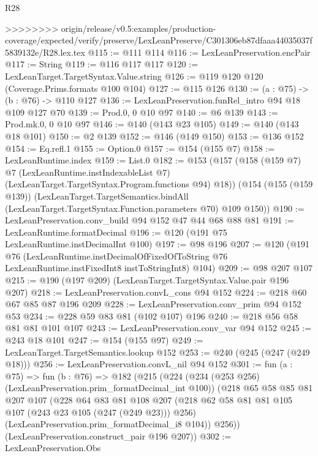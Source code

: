 \begin{lexlean}{R28}
\begin{coremodule}
{{{{{>>>>>>>> origin/release/v0.5:examples/production-coverage/expected/verify/preserve/LexLeanPreserve/C301306eb87dfaaa44035037f5839132e/R28.lex.tex
@115 := @111 @114
@116 := LexLeanPreservation.encPair
@117 := String
@119 := @116 @117 @117
@120 := LexLeanTarget.TargetSyntax.Value.string
@126 := @119 @120 @120 (Coverage.Prims.formats @100 @104)
@127 := @115 @126
@130 := (a : @75) -> (b : @76) -> @110 @127
@136 := LexLeanPreservation.funRel_intro @94 @18 @109 @127 @70
@139 := Prod.{0, 0} @10 @97
@140 := @6 @139
@143 := Prod.mk.{0, 0} @10 @97
@146 := @140 (@143 @23 @105)
@149 := @140 (@143 @18 @101)
@150 := @2 @139
@152 := @146 (@149 @150)
@153 := @136 @152
@154 := Eq.refl.{1}
@155 := Option.{0}
@157 := @154 (@155 @7)
@158 := LexLeanRuntime.index
@159 := List.{0}
@182 := @153
    (@157
      (@158
        (@159 @7)
        @7
        (LexLeanRuntime.instIndexableList @7)
        (LexLeanTarget.TargetSyntax.Program.functions @94)
        @18))
    (@154
      (@155 (@159 @139))
      (LexLeanTarget.TargetSemantics.bindAll
        (LexLeanTarget.TargetSyntax.Function.parameters @70)
        @109
        @150))
@190 := LexLeanPreservation.conv_build @94 @152 @47 @44 @68 @88 @81
@191 := LexLeanRuntime.formatDecimal
@196 := @120 (@191 @75 LexLeanRuntime.instDecimalInt @100)
@197 := @98 @196
@207 := @120
    (@191
      @76
      (LexLeanRuntime.instDecimalOfFixedOfToString
        @76
        LexLeanRuntime.instFixedInt8
        instToStringInt8)
      @104)
@209 := @98 @207 @107
@215 := @190 (@197 @209) (LexLeanTarget.TargetSyntax.Value.pair @196 @207)
@218 := LexLeanPreservation.convL_cons @94 @152
@224 := @218 @60 @67 @85 @87 @196 @209
@228 := LexLeanPreservation.conv_prim @94 @152 @53
@234 := @228 @59 @83 @81 (@102 @107) @196
@240 := @218 @56 @58 @81 @81 @101 @107
@243 := LexLeanPreservation.conv_var @94 @152
@245 := @243 @18 @101
@247 := @154 (@155 @97)
@249 := LexLeanTarget.TargetSemantics.lookup @152
@253 := @240 (@245 (@247 (@249 @18)))
@256 := LexLeanPreservation.convL_nil @94 @152
@301 := fun (a : @75) =>
  fun (b : @76) =>
  @182
    (@215
      (@224
        (@234 (@253 @256) (LexLeanPreservation.prim_formatDecimal_int @100))
        (@218
          @65
          @58
          @85
          @81
          @207
          @107
          (@228
            @64
            @83
            @81
            @108
            @207
            (@218 @62 @58 @81 @81 @105 @107 (@243 @23 @105 (@247 (@249 @23))) @256)
            (LexLeanPreservation.prim_formatDecimal_i8 @104))
          @256))
      (LexLeanPreservation.construct_pair @196 @207))
@302 := LexLeanPreservation.Obs
}}}}}
\end{coremodule}
\end{lexlean}
